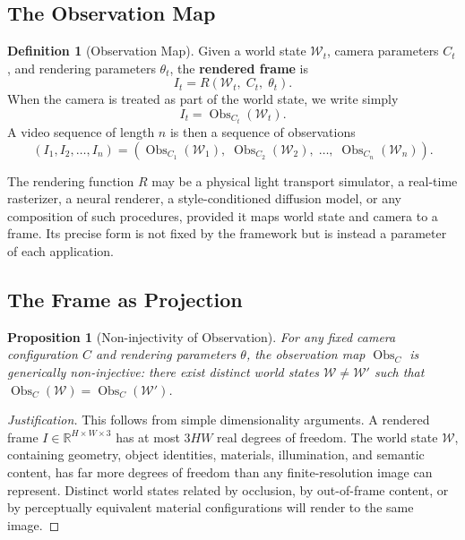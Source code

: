 \documentclass[12pt,a4paper]{article}
\theoremstyle{plain}
\newtheorem{proposition}[theorem]{Proposition}
\theoremstyle{definition}
\newtheorem{definition}[theorem]{Definition}
\theoremstyle{remark}
\DeclareMathOperator{\Obs}{Obs}
\begin{document}
\subsection{The Observation Map}

\begin{definition}[Observation Map]
Given a world state $\mathcal{W}_t$, camera parameters $C_t$, and rendering parameters $\theta_t$, the \textbf{rendered frame} is
\[
I_t = R(\mathcal{W}_t,\; C_t,\; \theta_t).
\]
When the camera is treated as part of the world state, we write simply
\[
I_t = \Obs_{C_t}(\mathcal{W}_t).
\]
A video sequence of length $n$ is then a sequence of observations
\[
(I_1, I_2, \ldots, I_n) = (\Obs_{C_1}(\mathcal{W}_1),\; \Obs_{C_2}(\mathcal{W}_2),\; \ldots,\; \Obs_{C_n}(\mathcal{W}_n)).
\]
\end{definition}

The rendering function $R$ may be a physical light transport simulator, a real-time rasterizer, a neural renderer, a style-conditioned diffusion model, or any composition of such procedures, provided it maps world state and camera to a frame. Its precise form is not fixed by the framework but is instead a parameter of each application.

\subsection{The Frame as Projection}

\begin{proposition}[Non-injectivity of Observation]
For any fixed camera configuration $C$ and rendering parameters $\theta$, the observation map $\Obs_C$ is generically non-injective: there exist distinct world states $\mathcal{W} \neq \mathcal{W}'$ such that $\Obs_C(\mathcal{W}) = \Obs_C(\mathcal{W}')$.
\end{proposition}

\begin{proof}[Justification]
This follows from simple dimensionality arguments. A rendered frame $I \in \mathbb{R}^{H \times W \times 3}$ has at most $3HW$ real degrees of freedom. The world state $\mathcal{W}$, containing geometry, object identities, materials, illumination, and semantic content, has far more degrees of freedom than any finite-resolution image can represent. Distinct world states related by occlusion, by out-of-frame content, or by perceptually equivalent material configurations will render to the same image.
\end{proof}
\end{document}
